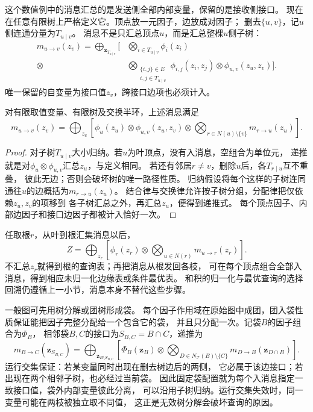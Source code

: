 这个数值例中的消息汇总的是发送侧全部内部变量，保留的是接收侧接口。
现在在任意有限树上严格定义它。顶点放一元因子，边放成对因子；
删去\(\{u,v\}\)，记\(u\)侧连通分量为\(T_{u\mid v}\)。
消息不是只汇总顶点\(u\)，而是汇总整棵\(u\)侧子树：
\begin{equation}
  \begin{aligned}
    m_{u\to v}(z_v)
    =\bigoplus_{\bm z_{T_{u\mid v}}}
    \biggl[
      &\bigotimes_{i\in T_{u\mid v}}\phi_i(z_i)\\[-2pt]
      {}\otimes&
      \bigotimes_{\substack{\{i,j\}\in E\\i,j\in T_{u\mid v}}}
        \phi_{i,j}(z_i,z_j)
      \otimes\phi_{u,v}(z_u,z_v)
    \biggr].
  \end{aligned}
  \label{eq:graph-theory-tree-message-semantics}
\end{equation}
唯一保留的自变量为接口值\(z_v\)，跨接口边项也必须计入。

\begin{theorem}[树消息递推]
  \label{thm:graph-theory-tree-message-recursion}
  对有限取值变量、有限树及交换半环，上述消息满足
  \begin{equation}
    m_{u\to v}(z_v)=\bigoplus_{z_u}
    \left[
      \phi_u(z_u)\otimes\phi_{u,v}(z_u,z_v)
      \otimes\bigotimes_{r\in N(u)\setminus\{v\}}m_{r\to u}(z_u)
    \right].
    \label{eq:graph-theory-tree-message-recursion}
  \end{equation}
\end{theorem}

\begin{proof}
对子树\(T_{u\mid v}\)大小归纳。若\(u\)为叶顶点，没有入消息，空组合为单位元，
递推就是对\(\phi_u\otimes\phi_{u,v}\)汇总\(z_u\)，与定义相同。
若还有邻居\(r\neq v\)，删除\(u\)后，各\(T_{r\mid u}\)互不重叠，
彼此无边；否则会破坏树的唯一路径性质。
归纳假设将每个这样的子树连同通往\(u\)的边概括为\(m_{r\to u}(z_u)\)。
结合律与交换律允许按子树分组，分配律把仅依赖\(z_u,z_v\)的项移到
各子树汇总之外，再汇总\(z_u\)，便得到递推式。
每个顶点因子、内部边因子和接口边因子都被计入恰好一次。
\end{proof}

任取根\(r\)，从叶到根汇集消息以后，
\[
  Z=\bigoplus_{z_r}\left[\phi_r(z_r)\otimes
      \bigotimes_{u\in N(r)}m_{u\to r}(z_r)\right].
\]
不汇总\(z_r\)就得到根的查询表；再把消息从根发回各枝，
可在每个顶点组合全部入消息，得到相应未归一化边缘表或条件最优表。
和积的归一化与最优查询的选择回溯仍遵循上一小节，消息本身不替代这些步骤。

一般图可先用树分解或团树形成袋。
每个因子作用域在原始图中成团，团入袋性质保证能把因子完整分配给一个包含它的袋，
并且只分配一次。记袋\(B\)的因子组合为\(\Phi_B\)，
相邻袋\(B,C\)的接口为\(S_{B,C}=B\cap C\)，递推为
\[
  m_{B\to C}(\bm z_{S_{B,C}})
  =\bigoplus_{\bm z_{B\setminus S_{B,C}}}
    \left[
      \Phi_B(\bm z_B)\otimes
      \bigotimes_{D\in N_{\mathcal T}(B)\setminus\{C\}}
        m_{D\to B}(\bm z_{D\cap B})
    \right].
\]
运行交集保证：若某变量同时出现在删去树边后的两侧，
它必属于该边接口；若出现在两个相邻子树，也必经过当前袋。
因此固定袋配置就为每个入消息指定一致接口值，袋外内部变量彼此分离，
可以沿用子树归纳。运行交集失效时，同一变量可能在两枝被独立取不同值，
这正是无效树分解会破坏查询的原因。

